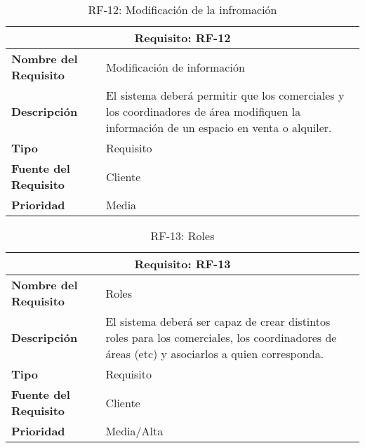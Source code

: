 \begin{table}[H]
\begin{center}
\begin{tabular}{p{} p{7cm}}
\multicolumn{2}{c}{\textbf{Requisito: RF-12} } \\
\hline \hline
\textbf{Nombre del Requisito} &  Modificación de información \\
\hline
\textbf{Descripción} & El sistema deberá permitir que los comerciales y los coordinadores de área modifiquen la información de un espacio en venta o alquiler. \\
\hline
\textbf{Tipo} & Requisito  \\
\hline
\textbf{Fuente del Requisito} &  Cliente \\
\hline
\textbf{Prioridad} &  Media \\ \hline
\end{tabular}
\caption{RF-12: Modificación de la infromación}
\label{tab:RF-12}
\end{center}
\end{table}

\begin{table}[H]
\begin{center}
\begin{tabular}{p{} p{7cm}}
\multicolumn{2}{c}{\textbf{Requisito: RF-13} } \\
\hline \hline
\textbf{Nombre del Requisito} &  Roles \\
\hline
\textbf{Descripción} & El sistema deberá ser capaz de crear distintos roles para los comerciales, los coordinadores de áreas (etc) y asociarlos a quien corresponda. \\
\hline
\textbf{Tipo} & Requisito  \\
\hline
\textbf{Fuente del Requisito} & Cliente  \\
\hline
\textbf{Prioridad} & Media/Alta  \\ \hline
\end{tabular}
\caption{RF-13: Roles}
\label{tab:RF13}
\end{center}
\end{table}

